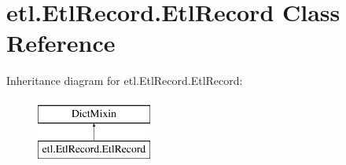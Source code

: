 \hypertarget{classetl_1_1EtlRecord_1_1EtlRecord}{\section{etl.\-Etl\-Record.\-Etl\-Record Class Reference}
\label{classetl_1_1EtlRecord_1_1EtlRecord}
}
Inheritance diagram for etl.\-Etl\-Record.\-Etl\-Record\-:\begin{figure}[H]
\begin{center}
\leavevmode
\includegraphics[height=2.000000cm]{classetl_1_1EtlRecord_1_1EtlRecord}
\end{center}
\end{figure}
